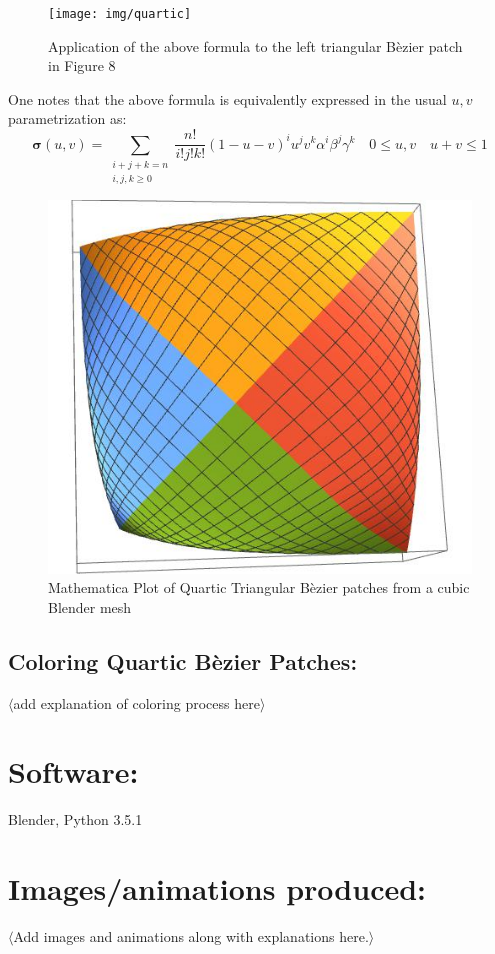 \documentclass[11pt]{article}
\begin{document}
	\begin{figure}[h]
		\centering
		\captionsetup{justification=centering}
		\texttt{[image: img/quartic]}
		\caption{Application of the above formula to the left triangular B\`ezier patch in Figure 8}
	\end{figure}
	\vspace{0.45in}
	
	\quad\quad  One notes that the above formula is equivalently expressed in the usual $u,v$ parametrization as: 
	 $$\displaystyle \bm{\sigma}(u,v) = \sum_{\begin{smallmatrix} i+j+k=n \\ i,j,k \ge 0\end{smallmatrix}} \frac{n!}{i!j!k!} (1-u-v)^i u^j v^k \alpha^i \beta^j \gamma^k \quad0 \le u,v \quad u + v \le 1$$
	
	\begin{figure}[h]
		\centering
		\captionsetup{justification=centering}
		\includegraphics[width=.43\linewidth]{img/bezier_patch}
		\caption{Mathematica Plot of Quartic Triangular B\`ezier patches from  a cubic Blender mesh}
	\end{figure}
	
	
	\pagebreak
	
	\subsection*{Coloring Quartic B\`ezier Patches:}
	$\langle$add explanation of coloring process here$\rangle$
	
	\section*{Software:}
	\vspace{-0.20in}
	Blender, Python 3.5.1
	
	
	\section*{Images/animations produced:}
	$\langle$Add images and animations along with explanations here.$\rangle$
	
\end{document}
